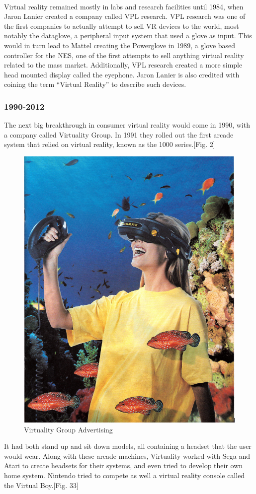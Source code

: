 \documentclass[a4paper,10pt]{article}
\begin{document}
	\par ~\\
	Virtual reality remained mostly in labs and research facilities until 1984, when Jaron Lanier created a company called VPL research.  VPL research was one of the first companies to actually attempt to sell VR devices to the world, most notably the dataglove, a peripheral input system that used a glove as input.  This would in turn lead to Mattel creating the Powerglove in 1989, a glove based controller for the NES, one of the first attempts to sell anything virtual reality related to the mass market.  Additionally, VPL research created a more simple head mounted display called the eyephone. Jaron Lanier is also credited with coining the term “Virtual Reality” to describe such devices.  
	\subsubsection{1990-2012}
	The next big breakthrough in consumer virtual reality would come in 1990, with a company called Virtuality Group.  In 1991 they rolled out the first arcade system that relied on virtual reality, known as the 1000 series.[Fig. 2]  
		\begin{figure}[H]
			\centerline{\includegraphics[scale=0.6]{virtuality.jpg}}
			\caption{Virtuality Group Advertising}
			\label{fig:virtuality}
		\end{figure}It had both stand up and sit down models, all containing a headset that the user would wear.  Along with these arcade machines, Virtuality worked with Sega and Atari to create headsets for their systems, and even tried to develop their own home system.  Nintendo tried to compete as well a virtual reality console called the Virtual Boy.[Fig. 33]
\end{document}
